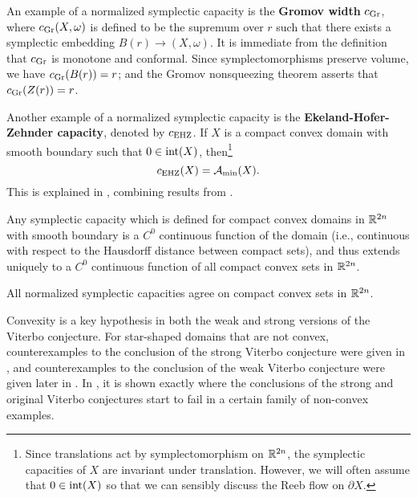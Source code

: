 An example of a normalized symplectic capacity is the {\bf Gromov width\/} $c_{\operatorname{Gr}}$, where $c_{\operatorname{Gr}}(X,\omega)$ is defined to be the supremum over $r$ such that there exists a symplectic embedding $B(r)\to (X,\omega)$. It is immediate from the definition that $c_{\operatorname{Gr}}$ is monotone and conformal. Since symplectomorphisms preserve volume, we have $c_{\operatorname{Gr}}(B(r))=r$; and the Gromov nonsqueezing theorem asserts that $c_{\operatorname{Gr}}(Z(r))=r$.

Another example of a normalized symplectic capacity is the {\bf Ekeland-Hofer-Zehnder capacity\/}, denoted by $c_{\operatorname{EHZ}}$. If $X$ is a compact convex domain with smooth boundary such that $0\in\operatorname{int}(X)$, then\footnote{Since translations act by symplectomorphism on ${\mathbb R}^{2n}$, the symplectic capacities of $X$ are invariant under translation. However, we will often assume that $0\in\operatorname{int}(X)$ so that we can sensibly discuss the Reeb flow on $\partial X$.}
\begin{equation}
\label{eqn:cehzamin}
c_{\operatorname{EHZ}}(X) = {\mathcal A}_{\operatorname{min}}(X).
\end{equation}
This is explained in \cite[Thm.\ 2.2]{artsteinostrover2014}, combining results from \cite{eh1,hz}.

Any symplectic capacity which is defined for compact convex domains in ${\mathbb R}^{2n}$ with smooth boundary is a $C^0$ continuous function of the domain (i.e., continuous with respect to the Hausdorff distance between compact sets), and thus extends uniquely to a $C^0$ continuous function of all compact convex sets in ${\mathbb R}^{2n}$.

\begin{conjecture}
\label{conj:vstrong}
All normalized symplectic capacities agree on compact convex sets in ${\mathbb R}^{2n}$.
\end{conjecture}

\begin{remark} Convexity is a key hypothesis in both the weak and strong versions of the Viterbo conjecture. For star-shaped domains that are not convex, counterexamples to the conclusion of the strong Viterbo conjecture were given in \cite[Thm.\ 1.12]{hermann}, and counterexamples to the conclusion of the weak Viterbo conjecture were given later in \cite[Thm.\ 2]{abhs}. In \cite[Cor.\ 5.2]{ghr}, it is shown exactly where the conclusions of the strong and original Viterbo conjectures start to fail in a certain family of non-convex examples.
\end{remark}

